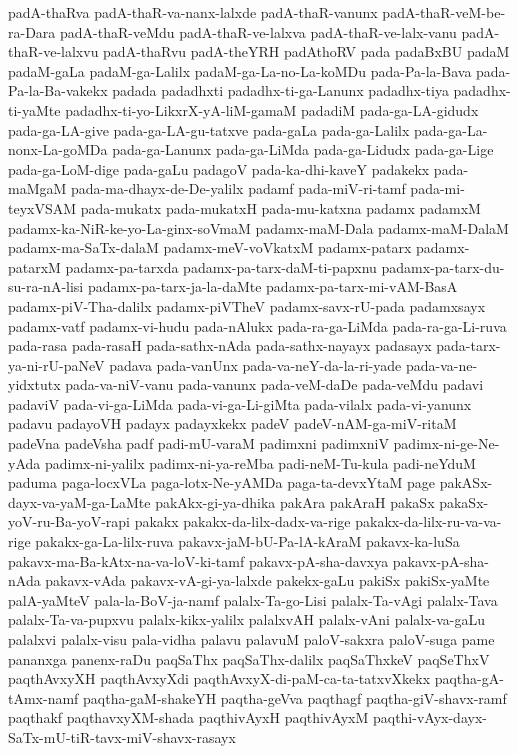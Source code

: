 {padA-thaRva
padA-thaR-va-nanx-lalxde
padA-thaR-vanunx
padA-thaR-veM-be-ra-Dara
padA-thaR-veMdu
padA-thaR-ve-lalxva
padA-thaR-ve-lalx-vanu
padA-thaR-ve-lalxvu
padA-thaRvu
padA-theYRH
padAthoRV
pada
padaBxBU
padaM
padaM-gaLa
padaM-ga-Lalilx
padaM-ga-La-no-La-koMDu
pada-Pa-la-Bava
pada-Pa-la-Ba-vakekx
padada
padadhxti
padadhx-ti-ga-Lanunx
padadhx-tiya
padadhx-ti-yaMte
padadhx-ti-yo-LikxrX-yA-liM-gamaM
padadiM
pada-ga-LA-gidudx
pada-ga-LA-give
pada-ga-LA-gu-tatxve
pada-gaLa
pada-ga-Lalilx
pada-ga-La-nonx-La-goMDa
pada-ga-Lanunx
pada-ga-LiMda
pada-ga-Lidudx
pada-ga-Lige
pada-ga-LoM-dige
pada-gaLu
padagoV
pada-ka-dhi-kaveY
padakekx
pada-maMgaM
pada-ma-dhayx-de-De-yalilx
padamf
pada-miV-ri-tamf
pada-mi-teyxVSAM
pada-mukatx
pada-mukatxH
pada-mu-katxna
padamx
padamxM
padamx-ka-NiR-ke-yo-La-ginx-soVmaM
padamx-maM-Dala
padamx-maM-DalaM
padamx-ma-SaTx-dalaM
padamx-meV-voVkatxM
padamx-patarx
padamx-patarxM
padamx-pa-tarxda
padamx-pa-tarx-daM-ti-papxnu
padamx-pa-tarx-du-su-ra-nA-lisi
padamx-pa-tarx-ja-la-daMte
padamx-pa-tarx-mi-vAM-BasA
padamx-piV-Tha-dalilx
padamx-piVTheV
padamx-savx-rU-pada
padamxsayx
padamx-vatf
padamx-vi-hudu
pada-nAlukx
pada-ra-ga-LiMda
pada-ra-ga-Li-ruva
pada-rasa
pada-rasaH
pada-sathx-nAda
pada-sathx-nayayx
padasayx
pada-tarx-ya-ni-rU-paNeV
padava
pada-vanUnx
pada-va-neY-da-la-ri-yade
pada-va-ne-yidxtutx
pada-va-niV-vanu
pada-vanunx
pada-veM-daDe
pada-veMdu
padavi
padaviV
pada-vi-ga-LiMda
pada-vi-ga-Li-giMta
pada-vilalx
pada-vi-yanunx
padavu
padayoVH
padayx
padayxkekx
padeV
padeV-nAM-ga-miV-ritaM
padeVna
padeVsha
padf
padi-mU-varaM
padimxni
padimxniV
padimx-ni-ge-Ne-yAda
padimx-ni-yalilx
padimx-ni-ya-reMba
padi-neM-Tu-kula
padi-neYduM
paduma
paga-locxVLa
paga-lotx-Ne-yAMDa
paga-ta-devxYtaM
page
pakASx-dayx-va-yaM-ga-LaMte
pakAkx-gi-ya-dhika
pakAra
pakAraH
pakaSx
pakaSx-yoV-ru-Ba-yoV-rapi
pakakx
pakakx-da-lilx-dadx-va-rige
pakakx-da-lilx-ru-va-va-rige
pakakx-ga-La-lilx-ruva
pakavx-jaM-bU-Pa-lA-kAraM
pakavx-ka-luSa
pakavx-ma-Ba-kAtx-na-va-loV-ki-tamf
pakavx-pA-sha-davxya
pakavx-pA-sha-nAda
pakavx-vAda
pakavx-vA-gi-ya-lalxde
pakekx-gaLu
pakiSx
pakiSx-yaMte
palA-yaMteV
pala-la-BoV-ja-namf
palalx-Ta-go-Lisi
palalx-Ta-vAgi
palalx-Tava
palalx-Ta-va-pupxvu
palalx-kikx-yalilx
palalxvAH
palalx-vAni
palalx-va-gaLu
palalxvi
palalx-visu
pala-vidha
palavu
palavuM
paloV-sakxra
paloV-suga
pame
pananxga
panenx-raDu
paqSaThx
paqSaThx-dalilx
paqSaThxkeV
paqSeThxV
paqthAvxyXH
paqthAvxyXdi
paqthAvxyX-di-paM-ca-ta-tatxvXkekx
paqtha-gA-tAmx-namf
paqtha-gaM-shakeYH
paqtha-geVva
paqthagf
paqtha-giV-shavx-ramf
paqthakf
paqthavxyXM-shada
paqthivAyxH
paqthivAyxM
paqthi-vAyx-dayx-SaTx-mU-tiR-tavx-miV-shavx-rasayx
}
